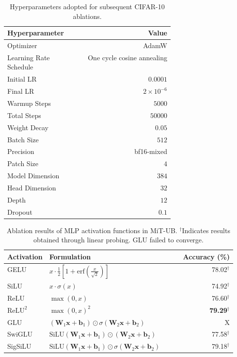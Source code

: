 \documentclass[12pt]{article}
\newcommand{\reluTwo}{$\text{ReLU}^2$}
\begin{document}
\begin{table}[H]
    \centering
    \begin{tabular}{p{0.4\linewidth}r}
        \toprule
        Hyperparameter & Value \\
        \midrule
        Optimizer & AdamW \\
        Learning Rate Schedule & One cycle cosine annealing \\
        Initial LR & \(0.0001\) \\
        Final LR & \(2 \times 10^{-6}\) \\
        Warmup Steps & \(5000\) \\
        Total Steps & \(50000\) \\
        Weight Decay & \(0.05\) \\
        \midrule
        Batch Size & \(512\) \\
        Precision & bf16-mixed \\
        \midrule
        Patch Size & \(4\) \\
        Model Dimension & \(384\) \\
        Head Dimension & \(32\) \\
        Depth & \(12\) \\
        Dropout & \(0.1\) \\
        \bottomrule
    \end{tabular}
    \caption{Hyperparameters adopted for subsequent CIFAR-10 ablations.}
    \label{tab:cifar10-hparams}
\end{table}


\begin{table}[H]
    \centering
    \begin{tabular}{p{0.15\linewidth}p{0.4\linewidth}r}
        \toprule
        Activation & Formulation & Accuracy (\%) \\
        \midrule
        GELU & \( x \cdot \frac{1}{2} \left[1 + \mathrm{erf}\left(\frac{x}{\sqrt{2}}\right)\right] \) & 78.02$^{\dagger}$ \\
        SiLU & \( x \cdot \sigma(x) \) & 74.92$^{\dagger}$ \\
        ReLU & \( \max(0, x) \) & 76.60$^{\dagger}$ \\
        \reluTwo & \( \max(0, x)^2 \) & \textbf{79.29}$^{\dagger}$ \\
        \midrule
        GLU & \( (\mathbf{W}_1 \mathbf{x} + \mathbf{b}_1) \odot \sigma(\mathbf{W}_2 \mathbf{x} + \mathbf{b}_2) \) & X \\
        SwiGLU & \( \mathrm{SiLU}(\mathbf{W}_1 \mathbf{x} + \mathbf{b}_1) \odot (\mathbf{W}_2 \mathbf{x} + \mathbf{b}_2) \) & 77.58$^{\dagger}$ \\
        SigSiLU & \( \mathrm{SiLU}(\mathbf{W}_1 \mathbf{x} + \mathbf{b}_1) \odot \sigma(\mathbf{W}_2 \mathbf{x} + \mathbf{b}_2) \) & 79.18$^{\dagger}$ \\
        \bottomrule
    \end{tabular}
    \caption{Ablation results of MLP activation functions in MiT-UB. $^\dagger$Indicates results obtained through linear probing. GLU failed to converge.}
    \label{tab:cifar10-accuracies-activation}
\end{table}
\end{document}
